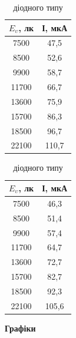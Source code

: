 \documentclass[a4paper,14pt]{extreport}
\begin{document}
\begin{table}[!h]
    \caption{ЛАХ сенсорів освітленості}
    \begin{subtable}{.5\linewidth}
      \centering
     \caption{резистивного типу}
\begin{tabular}{|c|c|}
\hline
$E_{\upsilon}$, лк & І, мкА \\ \hline
7500               & 47,5   \\ \hline
8500               & 52,6   \\ \hline
9900               & 58,7   \\ \hline
11700              & 66,7   \\ \hline
13600              & 75,9   \\ \hline
15700              & 86,3   \\ \hline
18500              & 96,7   \\ \hline
22100              & 110,7  \\ \hline
\end{tabular}
\end{subtable}%
\begin{subtable}{.5\linewidth}
\centering
 \caption{діодного типу}
\begin{tabular}{|c|c|}
\hline
$E_{\upsilon}$, лк & І, мкА \\ \hline
7500               & 46,3   \\ \hline
8500               & 51,4   \\ \hline
9900               & 57,4   \\ \hline
11700              & 64,7   \\ \hline
13600              & 72,7   \\ \hline
15700              & 82,7   \\ \hline
18500              & 92,3   \\ \hline
22100              & 105,6  \\ \hline
\end{tabular}
\end{subtable} 

\end{table}



\begin{center}
\textbf{Графіки}
\end{center}
\end{document}
